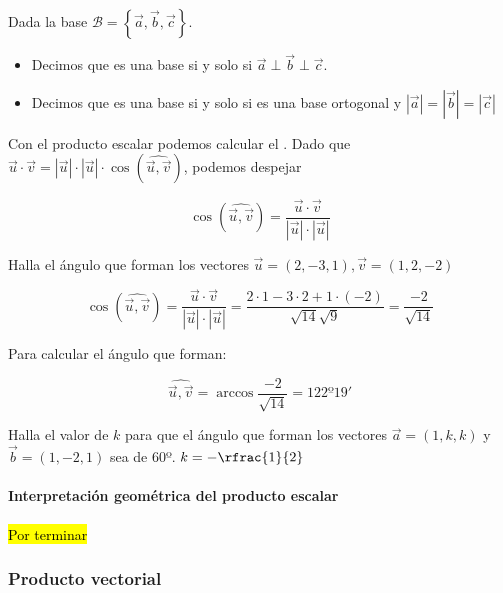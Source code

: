 Dada la base $\mathcal{B} = \left\{\vec{a},\vec{b},\vec{c}\right\}$.

\begin{itemize}
  \item Decimos que es una base  si y solo si $\vec{a}\perp\vec{b}\perp\vec{c}$.
  \item Decimos que es una base  si y solo si es una base ortogonal y $|\vec{a}| = |\vec{b}| = |\vec{c}|$
\end{itemize}


\obs Con el producto escalar podemos calcular el . Dado que $\vec{u}·\vec{v} = \left|\vec{u}\right|·\left|\vec{u}\right|·\cos\left(\widehat{\vec{u},\vec{v}}\right)$, podemos despejar 

\[\cos\left(\widehat{\vec{u},\vec{v}}\right) = \frac{\vec{u}·\vec{v}}{\left|\vec{u}\right|·\left|\vec{u}\right|}\]


\begin{problem}

Halla el ángulo que forman los vectores $\vec{u}=\left(2,-3,1\right),\vec{v}=\left(1,2,-2\right)$


\solution


\[\cos\left(\widehat{\vec{u},\vec{v}}\right) = \frac{\vec{u}·\vec{v}}{\left|\vec{u}\right|·\left|\vec{u}\right|} = \frac{2·1-3·2+1·(-2)}{\sqrt{14}{\sqrt{9}}} = \frac{-2}{\sqrt{14}}\]

Para calcular el ángulo que forman: 

\[
\widehat{\vec{u},\vec{v}} = \arccos \frac{-2}{\sqrt{14}} = 122º 19'
\]
\end{problem}

\begin{problem}

Halla el valor de $k$ para que el ángulo que forman los vectores $\vec{a} = (1,k,k)$ y $\vec{b} = (1,-2,1)$ sea de 60º. 
\solution
$k=-\rfrac{1}{2}$

\end{problem}

\paragraph{Interpretación geométrica del producto escalar}

\hl{Por terminar}

\subsubsection{Producto vectorial}


